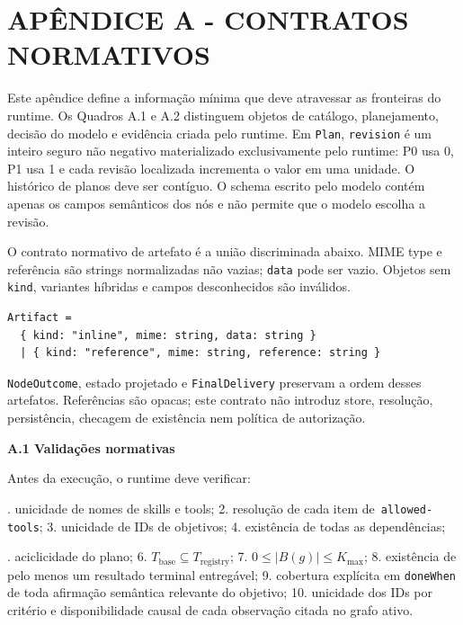 \documentclass[12pt,a4paper]{article}
\begin{document}

\section*{APÊNDICE A - CONTRATOS NORMATIVOS}

Este apêndice define a informação mínima que deve atravessar as fronteiras do runtime. Os Quadros A.1 e A.2 distinguem objetos de catálogo, planejamento, decisão do modelo e evidência criada pelo runtime. Em \texttt{Plan}, \texttt{revision} é um inteiro seguro não negativo materializado exclusivamente pelo runtime: P0 usa 0, P1 usa 1 e cada revisão localizada incrementa o valor em uma unidade. O histórico de planos deve ser contíguo. O schema escrito pelo modelo contém apenas os campos semânticos dos nós e não permite que o modelo escolha a revisão.

O contrato normativo de artefato é a união discriminada abaixo. MIME type e referência são strings normalizadas não vazias; \texttt{data} pode ser vazio. Objetos sem \texttt{kind}, variantes híbridas e campos desconhecidos são inválidos.

\begin{Verbatim}[breaklines=true,breakanywhere=true,fontsize=\small]
Artifact =
  { kind: "inline", mime: string, data: string }
  | { kind: "reference", mime: string, reference: string }
\end{Verbatim}

\texttt{NodeOutcome}, estado projetado e \texttt{FinalDelivery} preservam a ordem desses artefatos. Referências são opacas; este contrato não introduz store, resolução, persistência, checagem de existência nem política de autorização.






\textbf{A.1 Validações normativas}


Antes da execução, o runtime deve verificar:


. unicidade de nomes de skills e tools; 2. resolução de cada item de\texttt{ allowed-tools}; 3. unicidade de IDs de objetivos; 4. existência de todas as dependências;\par


. aciclicidade do plano; 6. $T_{\mathrm{base}} \subseteq T_{\mathrm{registry}}$; 7. $0 \leq |B(g)| \leq K_{\max}$; 8. existência de pelo menos um resultado terminal entregável; 9. cobertura explícita em \texttt{doneWhen} de toda afirmação semântica relevante do objetivo; 10. unicidade dos IDs por critério e disponibilidade causal de cada observação citada no grafo ativo.\par
\end{document}
